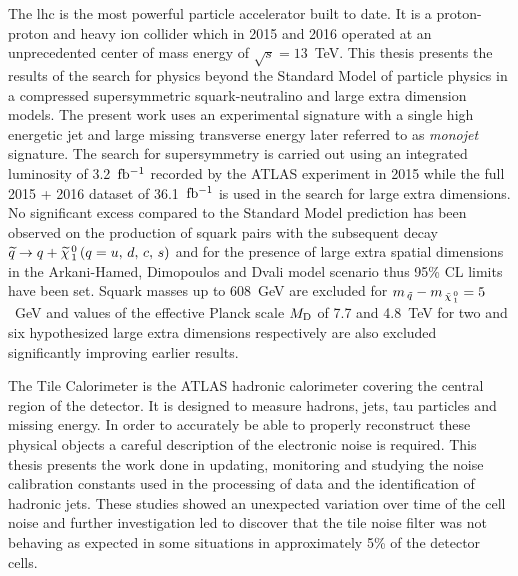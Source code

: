 The \gls{lhc} is the most powerful particle accelerator built to date. It is a
proton-proton and heavy ion collider which in 2015 and 2016 operated at an
unprecedented center of mass energy of $\sqrt{s} = 13$~TeV. This thesis presents
the results of the search for physics beyond the Standard Model of particle
physics in a compressed supersymmetric squark-neutralino and large extra
dimension models. The present work uses an experimental signature with a single
high energetic jet and large missing transverse energy later referred to as
\emph{monojet} signature. The search for supersymmetry is carried out using an
integrated luminosity of 3.2~$\mbox{fb$^{-1}$}$ recorded by the ATLAS experiment in 2015
while the full 2015 + 2016 dataset of 36.1~$\mbox{fb$^{-1}$}$ is used in the search for
large extra dimensions. No significant excess compared to the Standard Model
prediction has been observed on the production of squark pairs with the
subsequent decay $\widetilde{q} \rightarrow q + \widetilde{\chi}_{\, 1}^{\, 0}\, (q = u,\, d,\, c,\, s)$ and for the presence of large extra spatial
dimensions in the Arkani-Hamed, Dimopoulos and Dvali model scenario thus 95\% CL
limits have been set. Squark masses up to 608~GeV are excluded for
$m_{\, \tilde{q}} - m_{\, \tilde{\chi}_{\, 1}^{\, 0}} = 5$~GeV and values of the effective Planck scale $M_\mathrm{D}$
of 7.7 and 4.8~TeV for two and six hypothesized large extra dimensions
respectively are also excluded significantly improving earlier results.

The Tile Calorimeter is the ATLAS hadronic calorimeter covering the central
region of the detector. It is designed to measure hadrons, jets, tau particles
and missing energy. In order to accurately be able to properly reconstruct these
physical objects a careful description of the electronic noise is required. This
thesis presents the work done in updating, monitoring and studying the noise
calibration constants used in the processing of data and the identification of
hadronic jets. These studies showed an unexpected variation over time of the
cell noise and further investigation led to discover that the tile noise filter
was not behaving as expected in some situations in approximately 5\% of the
detector cells.
